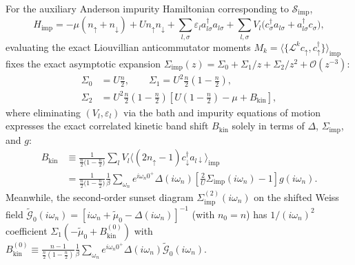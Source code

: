 \documentclass[11pt,a4paper]{article}
\numberwithin{equation}{section}
\theoremstyle{plain}
\theoremstyle{definition}
\begin{document}
For the auxiliary Anderson impurity Hamiltonian corresponding to
$\mathcal{S}_{\mathrm{imp}}$,
\begin{equation}
    H_{\mathrm{imp}} = -\mu(n_\uparrow + n_\downarrow) + U n_\uparrow n_\downarrow
        + \sum_{l,\sigma} \varepsilon_l a^\dagger_{l\sigma} a_{l\sigma}
        + \sum_{l,\sigma} V_l \bigl(c^\dagger_\sigma a_{l\sigma} + a^\dagger_{l\sigma} c_\sigma\bigr),
    \label{eq:H_imp}
\end{equation}
evaluating the exact Liouvillian anticommutator moments
$M_k = \langle \{ \mathcal{L}^k c_\uparrow, c^\dagger_\uparrow \} \rangle_{\mathrm{imp}}$
fixes the exact asymptotic expansion
$\Sigma_{\mathrm{imp}}(z) = \Sigma_0 + \Sigma_1/z + \Sigma_2/z^2 + \mathcal{O}(z^{-3})$:
\begin{align}
    \Sigma_0 &= U\frac{n}{2}, \qquad
    \Sigma_1 = U^2 \frac{n}{2}\left(1 - \frac{n}{2}\right),
    \label{eq:Sigma01} \\
    \Sigma_2 &= U^2 \frac{n}{2}\left(1 - \frac{n}{2}\right)
                \left[ U\left(1 - \frac{n}{2}\right) - \mu + B_{\mathrm{kin}} \right],
    \label{eq:Sigma2_exact}
\end{align}
where eliminating $(V_l, \varepsilon_l)$ via the bath and impurity equations of motion
expresses the exact correlated kinetic band shift $B_{\mathrm{kin}}$ solely in terms of
$\Delta$, $\Sigma_{\mathrm{imp}}$, and $g$:
\begin{equation}
\begin{split}
    B_{\mathrm{kin}}
    &\equiv \frac{1}{\frac{n}{2}\bigl(1 - \frac{n}{2}\bigr)}
           \sum_l V_l \bigl\langle (2n_\uparrow - 1) c^\dagger_\downarrow a_{l\downarrow} \bigr\rangle_{\mathrm{imp}} \\
    &= \frac{1}{\frac{n}{2}\bigl(1 - \frac{n}{2}\bigr)}
      \frac{1}{\beta} \sum_{\omega_n} e^{i\omega_n 0^+}
      \Delta(i\omega_n) \left[\frac{2}{U}\Sigma_{\mathrm{imp}}(i\omega_n) - 1\right] g(i\omega_n).
\end{split}
    \label{eq:Bkin_exact}
\end{equation}
Meanwhile, the second-order sunset diagram $\Sigma_{\mathrm{imp}}^{(2)}(i\omega_n)$ on
the shifted Weiss field $\tilde{\mathcal{G}}_0(i\omega_n) = [i\omega_n + \tilde{\mu}_0 - \Delta(i\omega_n)]^{-1}$
(with $n_0 = n$) has $1/(i\omega_n)^2$ coefficient
$\Sigma_1(-\tilde{\mu}_0 + B_{\mathrm{kin}}^{(0)})$ with
$B_{\mathrm{kin}}^{(0)} \equiv \frac{n-1}{\frac{n}{2}(1-\frac{n}{2})}\frac{1}{\beta}\sum_{\omega_n} e^{i\omega_n 0^+}\Delta(i\omega_n)\tilde{\mathcal{G}}_0(i\omega_n)$.
\end{document}
